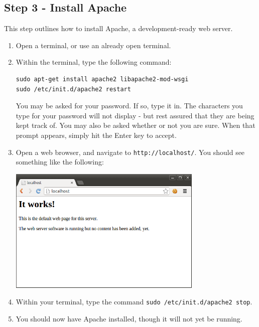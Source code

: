 \documentclass{article}
\begin{document}
\subsection{Step 3 - Install Apache}
This step outlines how to install Apache, a development-ready web server.
\begin{enumerate}
\item Open a terminal, or use an already open terminal.
\item Within the terminal, type the following command:
\begin{verbatim}
sudo apt-get install apache2 libapache2-mod-wsgi
sudo /etc/init.d/apache2 restart
\end{verbatim}
You may be asked for your password. If so, type it in. The characters you type for your password
will not display - but rest assured that they are being kept track of. You
may also be asked whether or not you are sure. When that prompt appears, simply hit the Enter key
to accept.
\pagebreak
\item Open a web browser, and navigate to \verb+http://localhost/+. You should see something like the following:


\includegraphics[height=6cm]{pic3.png}

\item Within your terminal, type the command \verb+sudo /etc/init.d/apache2 stop+.
\item You should now have Apache installed, though it will not yet be running.
\end{enumerate}
\end{document}
